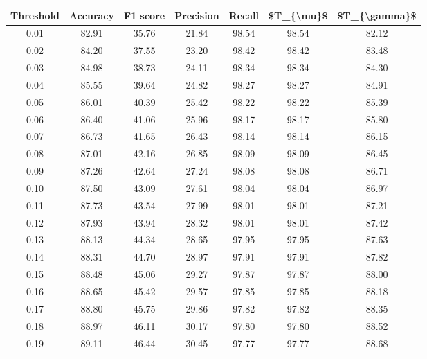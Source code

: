 \begin{tabular}{|c|c|c|c|c|c|c|}
\hline
 Threshold &  Accuracy &  F1 score &  Precision &  Recall &  \$T\_\{\textbackslash mu\}\$ &  \$T\_\{\textbackslash gamma\}\$ \\
\hline
      0.01 &     82.91 &     35.76 &      21.84 &   98.54 &      98.54 &         82.12 \\
      0.02 &     84.20 &     37.55 &      23.20 &   98.42 &      98.42 &         83.48 \\
      0.03 &     84.98 &     38.73 &      24.11 &   98.34 &      98.34 &         84.30 \\
      0.04 &     85.55 &     39.64 &      24.82 &   98.27 &      98.27 &         84.91 \\
      0.05 &     86.01 &     40.39 &      25.42 &   98.22 &      98.22 &         85.39 \\
      0.06 &     86.40 &     41.06 &      25.96 &   98.17 &      98.17 &         85.80 \\
      0.07 &     86.73 &     41.65 &      26.43 &   98.14 &      98.14 &         86.15 \\
      0.08 &     87.01 &     42.16 &      26.85 &   98.09 &      98.09 &         86.45 \\
      0.09 &     87.26 &     42.64 &      27.24 &   98.08 &      98.08 &         86.71 \\
      0.10 &     87.50 &     43.09 &      27.61 &   98.04 &      98.04 &         86.97 \\
      0.11 &     87.73 &     43.54 &      27.99 &   98.01 &      98.01 &         87.21 \\
      0.12 &     87.93 &     43.94 &      28.32 &   98.01 &      98.01 &         87.42 \\
      0.13 &     88.13 &     44.34 &      28.65 &   97.95 &      97.95 &         87.63 \\
      0.14 &     88.31 &     44.70 &      28.97 &   97.91 &      97.91 &         87.82 \\
      0.15 &     88.48 &     45.06 &      29.27 &   97.87 &      97.87 &         88.00 \\
      0.16 &     88.65 &     45.42 &      29.57 &   97.85 &      97.85 &         88.18 \\
      0.17 &     88.80 &     45.75 &      29.86 &   97.82 &      97.82 &         88.35 \\
      0.18 &     88.97 &     46.11 &      30.17 &   97.80 &      97.80 &         88.52 \\
      0.19 &     89.11 &     46.44 &      30.45 &   97.77 &      97.77 &         88.68 \\

\end{tabular}
